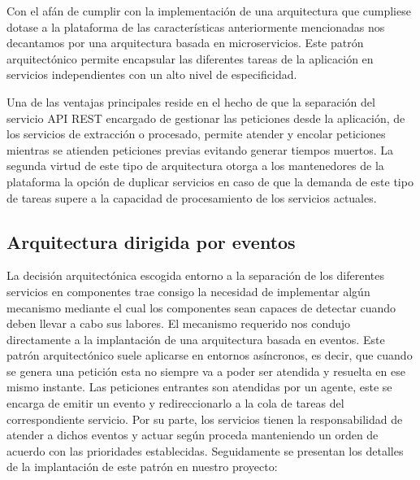 Con el afán de cumplir con la implementación de una arquitectura que cumpliese dotase a la plataforma de las características anteriormente mencionadas nos decantamos por una arquitectura basada en microservicios. Este patrón arquitectónico permite encapsular las diferentes tareas de la aplicación en servicios independientes con un alto nivel de especificidad.

Una de las ventajas principales reside en el hecho de que la separación del servicio API REST encargado de gestionar las peticiones desde la aplicación, de los servicios de extracción o procesado, permite atender y encolar peticiones mientras se atienden peticiones previas evitando generar tiempos muertos. La segunda virtud de este tipo de arquitectura otorga a los mantenedores de la plataforma la opción de duplicar servicios en caso de que la demanda de este tipo de tareas supere a la capacidad de procesamiento de los servicios actuales.

\subsection{Arquitectura dirigida por eventos} \label{sec:dirigida_por_eventos}

La decisión arquitectónica escogida entorno a la separación de los diferentes servicios en componentes trae consigo la necesidad de implementar algún mecanismo mediante el cual los componentes sean capaces de detectar cuando deben llevar a cabo sus labores. El mecanismo requerido nos condujo directamente a la implantación de una arquitectura basada en eventos.
Este patrón arquitectónico suele aplicarse en entornos asíncronos, es decir, que cuando se genera una petición esta no siempre va a poder ser atendida y resuelta en ese mismo instante. Las peticiones entrantes son atendidas por un agente, este se encarga de emitir un evento y redireccionarlo a la cola de tareas del correspondiente servicio. Por su parte, los servicios tienen la responsabilidad de atender a dichos eventos y actuar según proceda manteniendo un orden de acuerdo con las prioridades establecidas. Seguidamente se presentan los detalles de la implantación de este patrón en nuestro proyecto:

